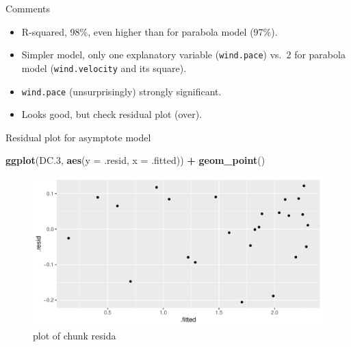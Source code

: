 \documentclass[ignorenonframetext,]{beamer}
\newenvironment{Shaded}{\begin{snugshade}}{\end{snugshade}}
\newcommand{\DataTypeTok}[1]{\textcolor[rgb]{0.13,0.29,0.53}{#1}}
\newcommand{\FloatTok}[1]{\textcolor[rgb]{0.00,0.00,0.81}{#1}}
\newcommand{\KeywordTok}[1]{\textcolor[rgb]{0.13,0.29,0.53}{\textbf{#1}}}
\newcommand{\NormalTok}[1]{#1}
\newcommand{\OperatorTok}[1]{\textcolor[rgb]{0.81,0.36,0.00}{\textbf{#1}}}
\newcommand{\StringTok}[1]{\textcolor[rgb]{0.31,0.60,0.02}{#1}}
\providecommand{\tightlist}{%
  \setlength{\itemsep}{0pt}\setlength{\parskip}{0pt}}
\begin{document}
\begin{frame}[fragile]{Comments}
\protect\hypertarget{comments-16}{}

\begin{itemize}
\tightlist
\item
  R-squared, 98\%, even higher than for parabola model (97\%).
\item
  Simpler model, only one explanatory variable (\texttt{wind.pace})
  vs.~2 for parabola model (\texttt{wind.velocity} and its square).
\item
  \texttt{wind.pace} (unsurprisingly) strongly significant.
\item
  Looks good, but check residual plot (over).
\end{itemize}

\end{frame}

\begin{frame}[fragile]{Residual plot for asymptote model}
\protect\hypertarget{residual-plot-for-asymptote-model}{}

\begin{Shaded}
\begin{Highlighting}[]
\KeywordTok{ggplot}\NormalTok{(DC}\FloatTok{.3}\NormalTok{, }\KeywordTok{aes}\NormalTok{(}\DataTypeTok{y =}\NormalTok{ .resid, }\DataTypeTok{x =}\NormalTok{ .fitted)) }\OperatorTok{+}\StringTok{ }\KeywordTok{geom_point}\NormalTok{()}
\end{Highlighting}
\end{Shaded}

\begin{figure}
\centering
\includegraphics{figure/resida-1.pdf}
\caption{plot of chunk resida}
\end{figure}

\end{frame}
\end{document}
